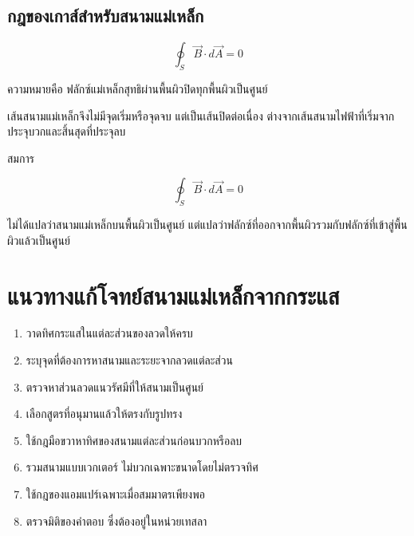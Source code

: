 \subsection{กฎของเกาส์สำหรับสนามแม่เหล็ก}

\begin{tcolorbox}[title={กฎของเกาส์สำหรับสนามแม่เหล็ก}]
\[
\boxed{
\oint_S\vec{B}\cdot d\vec{A}=0}
\]
\end{tcolorbox}

ความหมายคือ ฟลักซ์แม่เหล็กสุทธิผ่านพื้นผิวปิดทุกพื้นผิวเป็นศูนย์

เส้นสนามแม่เหล็กจึงไม่มีจุดเริ่มหรือจุดจบ แต่เป็นเส้นปิดต่อเนื่อง ต่างจากเส้นสนามไฟฟ้าที่เริ่มจากประจุบวกและสิ้นสุดที่ประจุลบ

\begin{tcolorbox}[title={ข้อควรระวัง}]
สมการ

\[
\oint_S\vec{B}\cdot d\vec{A}=0
\]

ไม่ได้แปลว่าสนามแม่เหล็กบนพื้นผิวเป็นศูนย์ แต่แปลว่าฟลักซ์ที่ออกจากพื้นผิวรวมกับฟลักซ์ที่เข้าสู่พื้นผิวแล้วเป็นศูนย์
\end{tcolorbox}

\section{แนวทางแก้โจทย์สนามแม่เหล็กจากกระแส}

\begin{enumerate}
    \item วาดทิศกระแสในแต่ละส่วนของลวดให้ครบ
    \item ระบุจุดที่ต้องการหาสนามและระยะจากลวดแต่ละส่วน
    \item ตรวจหาส่วนลวดแนวรัศมีที่ให้สนามเป็นศูนย์
    \item เลือกสูตรที่อนุมานแล้วให้ตรงกับรูปทรง
    \item ใช้กฎมือขวาหาทิศของสนามแต่ละส่วนก่อนบวกหรือลบ
    \item รวมสนามแบบเวกเตอร์ ไม่บวกเฉพาะขนาดโดยไม่ตรวจทิศ
    \item ใช้กฎของแอมแปร์เฉพาะเมื่อสมมาตรเพียงพอ
    \item ตรวจมิติของคำตอบ ซึ่งต้องอยู่ในหน่วยเทสลา
\end{enumerate}

